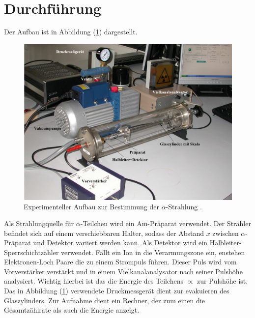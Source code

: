 \section{Durchführung}
Der Aufbau ist in Abbildung (\ref{abb:1}) dargestellt.
\begin{figure}[H]
  \centering
  \includegraphics[width=\textwidth]{content/Aufbau.png}
  \caption{Experimenteller Aufbau zur Bestimmung der $\alpha$-Strahlung \cite{1}.}
  \label{abb:1}
\end{figure}
Als Strahlungquelle für $\alpha$-Teilchen wird ein Am-Präparat verwendet.
Der Strahler befindet sich auf einem verschiebbaren Halter, sodass der Abstand $x$
zwischen $\alpha$-Präparat und Detektor variiert werden kann. Als Detektor
wird ein Halbleiter-Sperrschichtzähler verwendet. Fällt ein Ion in die Verarmungszone
ein, enstehen Elektronen-Loch Paare die zu einem Strompuls führen. Dieser Puls wird
vom Vorverstärker verstärkt und in einem Vielkanalanalysator nach seiner Pulshöhe analysiert. Wichtig hierbei
ist das die Energie des Teilchens $\propto $ zur Pulshöhe ist.
Das in Abbildung (\ref{abb:1}) verwendete Druckmessgerät dient zur evakuieren des Glaszylinders.
Zur Aufnahme dient ein Rechner, der zum einen die Gesamtzählrate als auch die Energie anzeigt.
